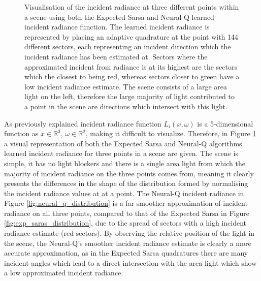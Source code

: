 \documentclass[../dissertation.tex]{subfiles}
\begin{document}
\begin{figure}[h]
  \label{fig:neural_q_distribution}
\endminipage
\caption{Visualisation of the incident radiance at three different points within a scene using both the Expected Sarsa and Neural-Q learned incident radiance function. The learned incident radiance is represented by placing an adaptive quadrature at the point with 144 different sectors, each representing an incident direction which the incident radiance has been estimated at. Sectors where the approximated incident from radiance is at its highest are the sectors which the closest to being red, whereas sectors closer to green have a low incident radiance estimate. The scene consists of a large area light on the left, therefore the large majority of light contributed to a point in the scene are directions which intersect with this light.}
\label{fig:distribution_visualisation}
\end{figure}

As previously explained incident radiance function $L_i(x, \omega)$ is a 5-dimensional function as $x \in \mathbb{R}^3$, $\omega \in \mathbb{R}^2$, making it difficult to visualize. Therefore, in Figure \ref{fig:distribution_visualisation} a visual representation of both the Expected Sarsa and Neural-Q algorithms learned incident radiance for three points in a scene are given. The scene is simple, it has no light blockers and there is a single area light from which the majority of incident radiance on the three points comes from, meaning it clearly presents the differences in the shape of the distribution formed by normalising the incident radiance values at at a point. The Neural-Q incident radiance in Figure \ref{fig:neural_q_distribution} is a far smoother approximation of incident radiance on all three points, compared to that of the Expected Sarsa in Figure \ref{fig:exp_saras_distribution}, due to the spread of sectors with a high incident radiance estimate (red sectors). By observing the relative position of the light in the scene, the Neural-Q's smoother incident radiance estimate is clearly a more accurate approximation, as in the Expected Sarsa quadratures there are many incident angles which lead to a direct intersection with the area light which show a low approximated incident radiance. 
\end{document}
